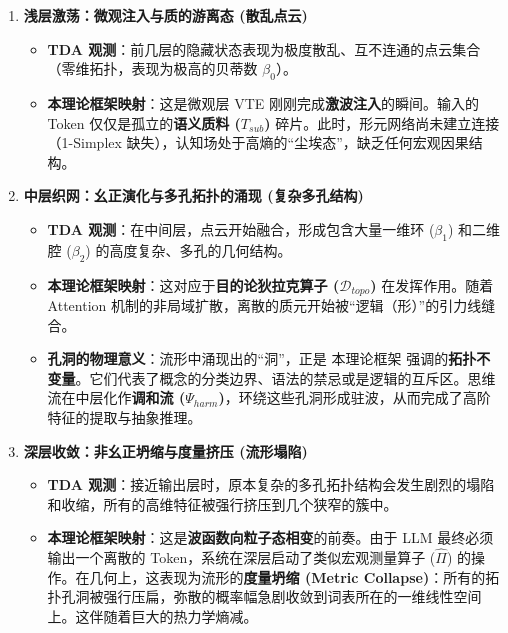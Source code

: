 \begin{enumerate}
    \item \textbf{\textcolor{structurecolor}{浅层激荡：微观注入与质的游离态 (散乱点云)}}
    \begin{itemize}
        \item \textbf{TDA 观测}：前几层的隐藏状态表现为极度散乱、互不连通的点云集合（零维拓扑，表现为极高的贝蒂数 $\beta_0$）。
        \item \textbf{本理论框架映射}：这是微观层 VTE 刚刚完成\textbf{激波注入}的瞬间。输入的 Token 仅仅是孤立的\textbf{语义质料 ($T_{sub}$)} 碎片。此时，形元网络尚未建立连接（1-Simplex 缺失），认知场处于高熵的“尘埃态”，缺乏任何宏观因果结构。
    \end{itemize}

    \item \textbf{\textcolor{structurecolor}{中层织网：幺正演化与多孔拓扑的涌现 (复杂多孔结构)}}
    \begin{itemize}
        \item \textbf{TDA 观测}：在中间层，点云开始融合，形成包含大量一维环 ($\beta_1$) 和二维腔 ($\beta_2$) 的高度复杂、多孔的几何结构。
        \item \textbf{本理论框架映射}：这对应于\textbf{目的论狄拉克算子 ($\mathcal{D}_{topo}$)} 在发挥作用。随着 Attention 机制的非局域扩散，离散的质元开始被“逻辑（形）”的引力线缝合。
        \item \textbf{孔洞的物理意义}：流形中涌现出的“洞”，正是 本理论框架 强调的\textbf{拓扑不变量}。它们代表了概念的分类边界、语法的禁忌或是逻辑的互斥区。思维流在中层化作\textbf{调和流 ($\Psi_{harm}$)}，环绕这些孔洞形成驻波，从而完成了高阶特征的提取与抽象推理。
    \end{itemize}

    \item \textbf{\textcolor{structurecolor}{深层收敛：非幺正坍缩与度量挤压 (流形塌陷)}}
    \begin{itemize}
        \item \textbf{TDA 观测}：接近输出层时，原本复杂的多孔拓扑结构会发生剧烈的塌陷和收缩，所有的高维特征被强行挤压到几个狭窄的簇中。
        \item \textbf{本理论框架映射}：这是\textbf{波函数向粒子态相变}的前奏。由于 LLM 最终必须输出一个离散的 Token，系统在深层启动了类似宏观测量算子 ($\hat{\Pi}$) 的操作。在几何上，这表现为流形的\textbf{度量坍缩 (Metric Collapse)}：所有的拓扑孔洞被强行压扁，弥散的概率幅急剧收敛到词表所在的一维线性空间上。这伴随着巨大的热力学熵减。
    \end{itemize}
\end{enumerate}

